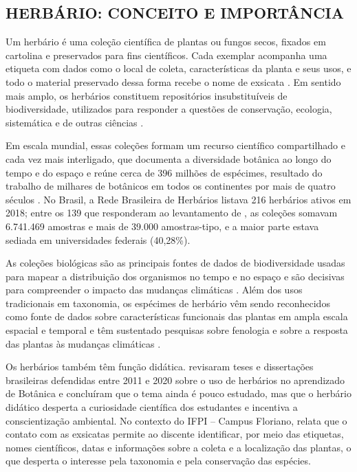 \documentclass[
    12pt,        %
    openany,     %
    oneside,     %
    a4paper,     %
    english,     %
    french,      %
    spanish,     %
    brazil,      %
    article      %
]{abntex2}
\begin{document}
\subsection{HERBÁRIO: CONCEITO E IMPORTÂNCIA}
\label{subsec:conceito-herbario}

Um herbário é uma coleção científica de plantas ou fungos secos, fixados em cartolina e preservados para fins científicos. Cada exemplar acompanha uma etiqueta com dados como o local de coleta, características da planta e seus usos, e todo o material preservado dessa forma recebe o nome de exsicata \cite{lopes2022herbarios}. Em sentido mais amplo, os herbários constituem repositórios insubstituíveis de biodiversidade, utilizados para responder a questões de conservação, ecologia, sistemática e de outras ciências \cite{gasper2020herbarios}.

Em escala mundial, essas coleções formam um recurso científico compartilhado e cada vez mais interligado, que documenta a diversidade botânica ao longo do tempo e do espaço e reúne cerca de 396 milhões de espécimes, resultado do trabalho de milhares de botânicos em todos os continentes por mais de quatro séculos \cite{heberling2022bigdata}. No Brasil, a Rede Brasileira de Herbários listava 216 herbários ativos em 2018; entre os 139 que responderam ao levantamento de , as coleções somavam 6.741.469 amostras e mais de 39.000 amostras-tipo, e a maior parte estava sediada em universidades federais (40,28\%).

As coleções biológicas são as principais fontes de dados de biodiversidade usadas para mapear a distribuição dos organismos no tempo e no espaço e são decisivas para compreender o impacto das mudanças climáticas \cite{gasper2020herbarios}. Além dos usos tradicionais em taxonomia, os espécimes de herbário vêm sendo reconhecidos como fonte de dados sobre características funcionais das plantas em ampla escala espacial e temporal \cite{heberling2022bigdata} e têm sustentado pesquisas sobre fenologia e sobre a resposta das plantas às mudanças climáticas \cite{willis2017oldplants}.

Os herbários também têm função didática.  revisaram teses e dissertações brasileiras defendidas entre 2011 e 2020 sobre o uso de herbários no aprendizado de Botânica e concluíram que o tema ainda é pouco estudado, mas que o herbário didático desperta a curiosidade científica dos estudantes e incentiva a conscientização ambiental. No contexto do IFPI -- Campus Floriano,  relata que o contato com as exsicatas permite ao discente identificar, por meio das etiquetas, nomes científicos, datas e informações sobre a coleta e a localização das plantas, o que desperta o interesse pela taxonomia e pela conservação das espécies.
\end{document}
